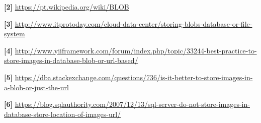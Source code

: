 \documentclass[12pt,a4paper]{article}
\begin{document}
\noindent \textbf{[2] }\url{https://pt.wikipedia.org/wiki/BLOB}\\\vspace{0.2cm}

\noindent \textbf{[3] }\url{http://www.itprotoday.com/cloud-data-center/storing-blobs-database-or-file-system}\\\vspace{0.2cm}

\noindent \textbf{[4] }\url{http://www.yiiframework.com/forum/index.php/topic/33244-best-practice-to-store-images-in-database-blob-or-url-based/}\\\vspace{0.2cm}

\noindent \textbf{[5] }\url{https://dba.stackexchange.com/questions/736/is-it-better-to-store-images-in-a-blob-or-just-the-url}\\\vspace{0.2cm}

\noindent \textbf{[6] }\url{https://blog.sqlauthority.com/2007/12/13/sql-server-do-not-store-images-in-database-store-location-of-images-url/}\\\vspace{0.2cm}
\end{document}
